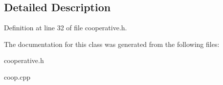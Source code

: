 \subsection{Detailed Description}




Definition at line 32 of file cooperative.h.

The documentation for this class was generated from the following files:\begin{CompactItemize}
\item 
cooperative.h\item 
coop.cpp\end{CompactItemize}
